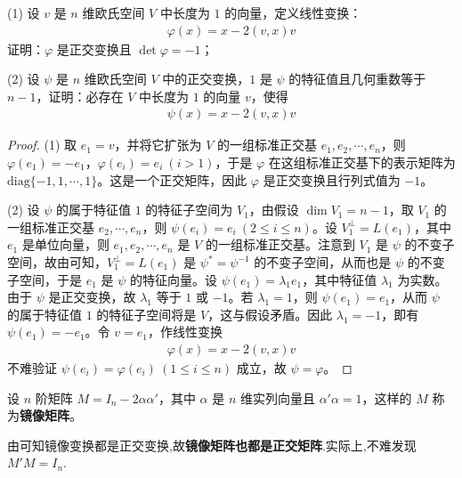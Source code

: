 \documentclass[../../main.tex]{subfiles}%
\begin{document}
\begin{proposition}[镜像变换的基本性质]\label{proposition:例9.40}
(1) 设 \(v\) 是 \(n\) 维欧氏空间 \(V\) 中长度为 \(1\) 的向量，定义线性变换：
\begin{align*}
\varphi(x) = x - 2(v,x)v
\end{align*}
证明：\(\varphi\) 是正交变换且 \(\det\varphi = -1\)；

(2) 设 \(\psi\) 是 \(n\) 维欧氏空间 \(V\) 中的正交变换，\(1\) 是 \(\psi\) 的特征值且几何重数等于 \(n - 1\)，证明：必存在 \(V\) 中长度为 \(1\) 的向量 \(v\)，使得
\begin{align*}
\psi(x) = x - 2(v,x)v
\end{align*}
\end{proposition}
\begin{proof}
(1) 取 \(e_1 = v\)，并将它扩张为 \(V\) 的一组标准正交基 \(e_1,e_2,\cdots,e_n\)，则 \(\varphi(e_1) = -e_1\)，\(\varphi(e_i) = e_i\ (i > 1)\)，于是 \(\varphi\) 在这组标准正交基下的表示矩阵为 \(\mathrm{diag}\{-1,1,\cdots,1\}\)。这是一个正交矩阵，因此 \(\varphi\) 是正交变换且行列式值为 \(-1\)。

(2) 设 \(\psi\) 的属于特征值 \(1\) 的特征子空间为 \(V_1\)，由假设 \(\dim V_1 = n - 1\)，取 \(V_1\) 的一组标准正交基 \(e_2,\cdots,e_n\)，则 \(\psi(e_i) = e_i\ (2\leqslant  i \leqslant  n)\)。设 \(V_1^{\perp} = L(e_1)\)，其中 \(e_1\) 是单位向量，则 \(e_1,e_2,\cdots,e_n\) 是 \(V\) 的一组标准正交基。注意到 \(V_1\) 是 \(\psi\) 的不变子空间，故由可知，\(V_1^{\perp} = L(e_1)\) 是 \(\psi^* = \psi^{-1}\) 的不变子空间，从而也是 \(\psi\) 的不变子空间，于是 \(e_1\) 是 \(\psi\) 的特征向量。设 \(\psi(e_1) = \lambda_1e_1\)，其中特征值 \(\lambda_1\) 为实数。由于 \(\psi\) 是正交变换，故 \(\lambda_1\) 等于 \(1\) 或 \(-1\)。若 \(\lambda_1 = 1\)，则 \(\psi(e_1) = e_1\)，从而 \(\psi\) 的属于特征值 \(1\) 的特征子空间将是 \(V\)，这与假设矛盾。因此 \(\lambda_1 = -1\)，即有 \(\psi(e_1) = -e_1\)。令 \(v = e_1\)，作线性变换
\begin{align*}
\varphi(x) = x - 2(v,x)v
\end{align*}
不难验证 \(\psi(e_i) = \varphi(e_i)\ (1\leqslant  i \leqslant  n)\) 成立，故 \(\psi = \varphi\)。
\end{proof}

\begin{definition}[镜像矩阵]
设 \(n\) 阶矩阵 \(M = I_n - 2\alpha\alpha'\)，其中 \(\alpha\) 是 \(n\) 维实列向量且 \(\alpha'\alpha = 1\)，这样的 \(M\) 称为\textbf{镜像矩阵}。
\end{definition}
\begin{remark}
由可知镜像变换都是正交变换,故\textbf{镜像矩阵也都是正交矩阵}.实际上,不难发现$M'M=I_n$.
\end{remark}
\end{document}
